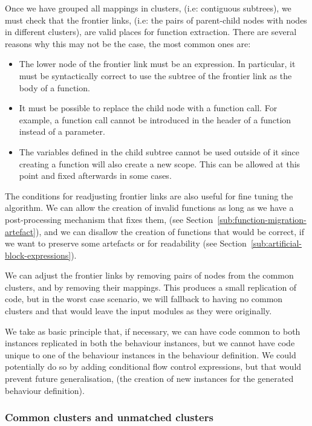 Once we have grouped all mappings in clusters, (i.e: contiguous subtrees),
we must check that the frontier links, (i.e: the pairs of parent-child
nodes with nodes in different clusters), are valid places for function
extraction. There are several reasons why this may not be the case,
the most common ones are:
\begin{itemize}
\item The lower node of the frontier link must be an expression. In particular,
it must be syntactically correct to use the subtree of the frontier link
as the body of a function.
\item It must be possible to replace the child node with a function call.
For example, a function call cannot be introduced in the header of
a function instead of a parameter.
\item The variables defined in the child subtree cannot be used outside
of it since creating a function will also create a new scope. This
can be allowed at this point and fixed afterwards in some cases.
\end{itemize}
The conditions for readjusting frontier links are also useful for fine
tuning the algorithm. We can allow the creation of invalid functions
as long as we have a post-processing mechanism that fixes them, (see
Section~\ref{sub:function-migration-artefact}), and we can disallow
the creation of functions that would be correct, if we want to preserve
some artefacts or for readability (see
Section~\ref{sub:artificial-block-expressions}).

We can adjust the frontier links by removing pairs of nodes from the common
clusters, and by removing their mappings. This produces a small replication
of code, but in the worst case scenario, we will fallback to having
no common clusters and that would leave the input modules as they
were originally.

We take as basic principle that, if necessary, we can have code common
to both instances replicated in both the behaviour instances, but
we cannot have code unique to one of the behaviour instances in
the behaviour definition. We could potentially do so by adding conditional
flow control expressions, but that would prevent future generalisation,
(the creation of new instances for the generated behaviour definition).


\subsubsection{Common clusters and unmatched clusters}

